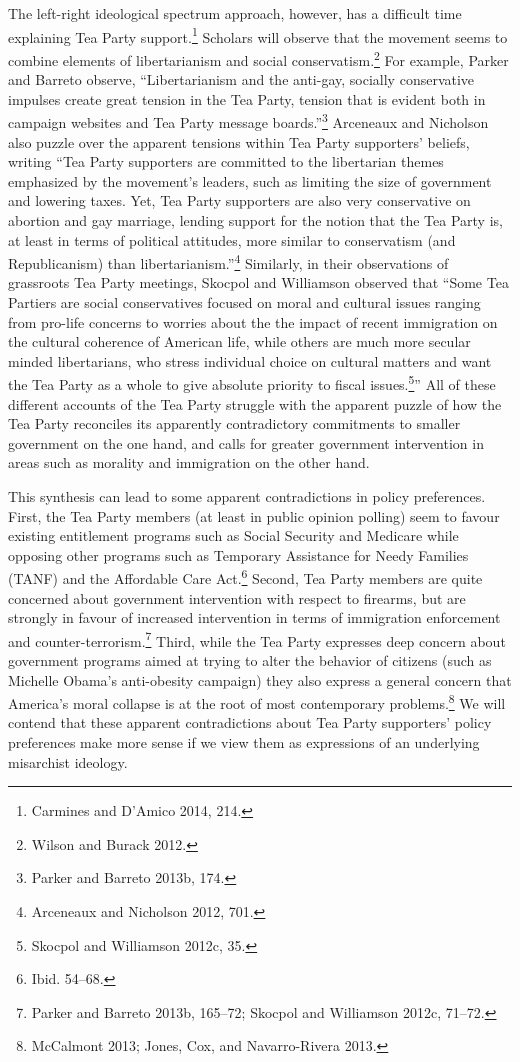 \documentclass[12pt,]{article}
\begin{document}
The left-right ideological spectrum approach, however, has a difficult
time explaining Tea Party support.\footnote{Carmines and D'Amico 2014,
  214. } Scholars will observe that the movement seems to combine
elements of libertarianism and social conservatism.\footnote{Wilson and
  Burack 2012. } For example, Parker and Barreto observe,
``Libertarianism and the anti-gay, socially conservative impulses create
great tension in the Tea Party, tension that is evident both in campaign
websites and Tea Party message boards.''\footnote{Parker and Barreto
  2013b, 174. } Arceneaux and Nicholson also puzzle over the apparent
tensions within Tea Party supporters' beliefs, writing ``Tea Party
supporters are committed to the libertarian themes emphasized by the
movement's leaders, such as limiting the size of government and lowering
taxes. Yet, Tea Party supporters are also very conservative on abortion
and gay marriage, lending support for the notion that the Tea Party is,
at least in terms of political attitudes, more similar to conservatism
(and Republicanism) than libertarianism.''\footnote{Arceneaux and
  Nicholson 2012, 701. } Similarly, in their observations of grassroots
Tea Party meetings, Skocpol and Williamson observed that ``Some Tea
Partiers are social conservatives focused on moral and cultural issues
ranging from pro-life concerns to worries about the the impact of recent
immigration on the cultural coherence of American life, while others are
much more secular minded libertarians, who stress individual choice on
cultural matters and want the Tea Party as a whole to give absolute
priority to fiscal issues.\footnote{Skocpol and Williamson 2012c, 35. }''
All of these different accounts of the Tea Party struggle with the
apparent puzzle of how the Tea Party reconciles its apparently
contradictory commitments to smaller government on the one hand, and
calls for greater government intervention in areas such as morality and
immigration on the other hand.

This synthesis can lead to some apparent contradictions in policy
preferences. First, the Tea Party members (at least in public opinion
polling) seem to favour existing entitlement programs such as Social
Security and Medicare while opposing other programs such as Temporary
Assistance for Needy Families (TANF) and the Affordable Care
Act.\footnote{Ibid. 54--68. } Second, Tea Party members are quite
concerned about government intervention with respect to firearms, but
are strongly in favour of increased intervention in terms of immigration
enforcement and counter-terrorism.\footnote{Parker and Barreto 2013b,
  165--72; Skocpol and Williamson 2012c, 71--72. } Third, while the Tea
Party expresses deep concern about government programs aimed at trying
to alter the behavior of citizens (such as Michelle Obama's anti-obesity
campaign) they also express a general concern that America's moral
collapse is at the root of most contemporary problems.\footnote{McCalmont
  2013; Jones, Cox, and Navarro-Rivera 2013. } We will contend that
these apparent contradictions about Tea Party supporters' policy
preferences make more sense if we view them as expressions of an
underlying misarchist ideology.
\end{document}
